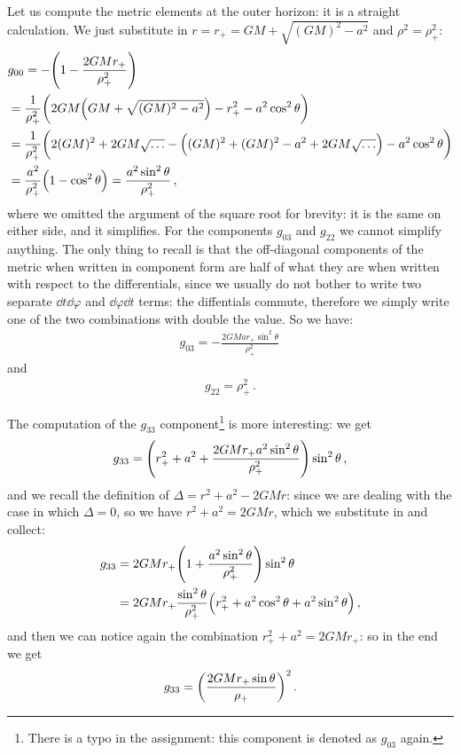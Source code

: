 \documentclass[main.tex]{subfiles}
\begin{document}
Let us compute the metric elements at the outer horizon: it is a straight calculation. We just substitute in \(r = r_{+} = GM + \sqrt{(GM)^2 - a^2}\) and \(\rho^2 = \rho^2_{+}\): 
%
\begin{subequations}
\begin{align}
  &g_{00}  = - \qty(1 - \frac{2GMr_{+}}{\rho_{+}^2})  \\
  &= \frac{1}{\rho_{+}^2} \qty(2GM \qty(GM + \sqrt{(GM)^2 - a^2}) - r_{+}^2 - a^2 \cos^2\theta )  \\
  &= \frac{1}{\rho_{+}^2} \qty( 2 (GM)^2 + 2GM \sqrt{\dots}- \qty((GM)^2 + (GM)^2 -a^2 + 2GM \sqrt{\dots}) - a^2 \cos^2 \theta )  \\
  &= \frac{a^2}{\rho_{+}^2}  \qty(1 - \cos^2 \theta ) = \frac{a^2 \sin^2\theta}{\rho_{+}^2}
\,,
\end{align}
\end{subequations}
%
where we omitted the argument of the square root for brevity: it is the same on either side, and it simplifies. 
For the components \(g_{03}\) and \(g_{22} \) we cannot simplify anything. The  only thing to recall is that the off-diagonal components of the metric when written in component form are half of what they are when written with respect to the differentials, since we usually do not bother to write two separate \(\dd{t} \dd{\varphi }\) and \(\dd{\varphi } \dd{t}\) terms: the diffentials commute, therefore we simply write one of the two combinations with double the value. So we have: 
%
\begin{align}
  g_{03} = -\frac{2GMa r_+ \sin^2\theta }{\rho_{+}^2}
\,
\end{align}
and 
%
\begin{align}
  g_{22} = \rho_{+}^2
\,.
\end{align}

The computation of the \(g_{33} \) component\footnote{There is a typo in the assignment: this component is denoted as \(g_{03}\) again.} is more interesting: we get 
%
\begin{align}
  g_{33} = \qty( r_+^2 + a^2 + \frac{2GMr_{+} a^2 \sin^2\theta }{\rho_{+}^2}) \sin^2 \theta 
\,,
\end{align}
%
and we recall the definition of \(\Delta = r^2 + a^2 - 2GM r\): since we are dealing with the case in which \(\Delta = 0\), so we have \(r^2 + a^2 = 2GMr\), which we substitute in and collect:
%
\begin{align}
  g_{33} &= 2GMr_{+} \qty(1 + \frac{a^2 \sin^2\theta }{\rho_{+}^2}) \sin^2\theta \\
  &= 2GMr_{+} \frac{\sin^2 \theta }{\rho_{+}^2} \qty(r_{+}^2 + a^2 \cos^2 \theta + a^2 \sin^2\theta )
\,,
\end{align}
%
and then we can notice again the combination \(r_{+}^2 + a^2 = 2GMr_{+}\): so in the end we get 
%
\begin{align}
  g_{33} = \qty(\frac{2GMr_{+} \sin \theta }{\rho_{+}})^2
\,.
\end{align}
\end{document}
